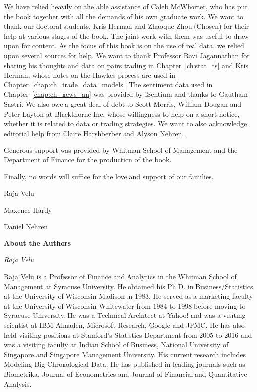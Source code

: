 We have relied heavily on the able assistance of Caleb McWhorter, who has put the book together with all the demands of his own graduate work. We want to thank our doctoral students, Kris Herman and Zhaoque Zhou (Chosen) for their help at various stages of the book. The joint work with them was useful to draw upon for content. As the focus of this book is on the use of real data, we relied upon several sources for help. We want to thank Professor Ravi Jagannathan for sharing his thoughts and data on pairs trading in Chapter~\ref{ch:stat_ts} and Kris Herman, whose notes on the Hawkes process are used in Chapter~\ref{chap:ch_trade_data_models}. The sentiment data used in Chapter~\ref{chap:ch_news_an} was provided by iSentium and thanks to Gautham Sastri. We also owe a great deal of debt to Scott Morris, William Dougan and Peter Layton at Blackthorne Inc, whose willingness to help on a short notice, whether it is related to data or trading strategies. We want to also acknowledge editorial help from Claire Harshberber and Alyson Nehren. 


Generous support was provided by Whitman School of Management and the Department of Finance for the production of the book. 


Finally, no words will suffice for the love and support of our families. \vspace{3\baselineskip}


\noindent Raja Velu \par
\noindent Maxence Hardy \par
\noindent Daniel Nehren



\newpage



{\noindent\Large\bfseries About the Authors} \vspace{1cm}


{\noindent\large\itshape Raja Velu} \medskip

\noindent Raja Velu is a Professor of Finance and Analytics in the Whitman School of Management at Syracuse University. He obtained his Ph.D. in Business/Statistics at the University of Wisconsin-Madison in 1983. He served as a marketing faculty at the University of Wisconsin-Whitewater from 1984 to 1998 before moving to Syracuse University. He was a Technical Architect at Yahoo! and was a visiting scientist at IBM-Almaden, Microsoft Research, Google and JPMC. He has also held visiting positions at Stanford's Statistics Department from 2005 to 2016 and was a visiting faculty at Indian School of Business, National University of Singapore and Singapore Management University. His current research includes Modeling Big Chronological Data. He has published in leading journals such as Biometrika, Journal of Econometrics and Journal of Financial and Quantitative Analysis. \bigskip


